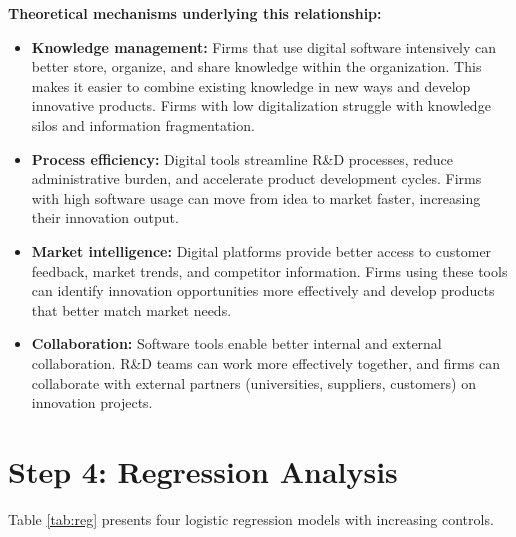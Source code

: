 \documentclass[a4paper,12pt]{article}
\begin{document}
\textbf{Theoretical mechanisms underlying this relationship:}
\begin{itemize}
    \item \textbf{Knowledge management:} Firms that use digital software intensively can better store, organize, and share knowledge within the organization. This makes it easier to combine existing knowledge in new ways and develop innovative products. Firms with low digitalization struggle with knowledge silos and information fragmentation.
    
    \item \textbf{Process efficiency:} Digital tools streamline R\&D processes, reduce administrative burden, and accelerate product development cycles. Firms with high software usage can move from idea to market faster, increasing their innovation output.
    
    \item \textbf{Market intelligence:} Digital platforms provide better access to customer feedback, market trends, and competitor information. Firms using these tools can identify innovation opportunities more effectively and develop products that better match market needs.
    
    \item \textbf{Collaboration:} Software tools enable better internal and external collaboration. R\&D teams can work more effectively together, and firms can collaborate with external partners (universities, suppliers, customers) on innovation projects.
\end{itemize}

\section*{Step 4: Regression Analysis}

Table \ref{tab:reg} presents four logistic regression models with increasing controls.
\end{document}
